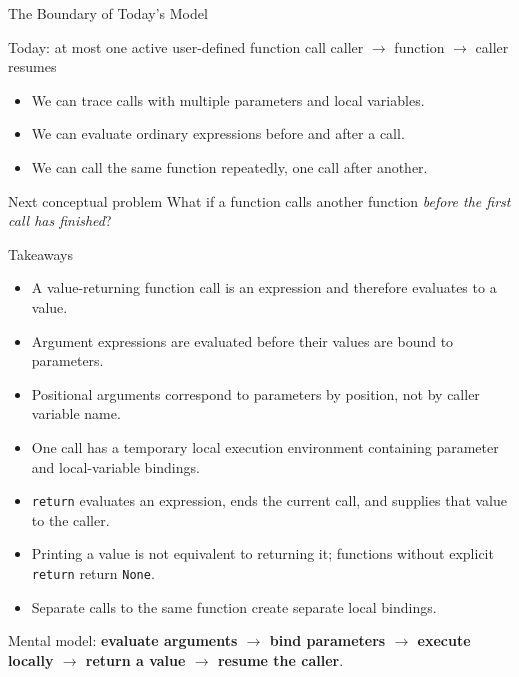 \documentclass[aspectratio=169,10pt]{beamer}
\begin{document}
\begin{frame}{The Boundary of Today's Model}
  \begin{block}{Today: at most one active user-defined function call}
    \centering
    caller
    $\longrightarrow$
    function
    $\longrightarrow$
    caller resumes
  \end{block}

  \begin{itemize}
    \item We can trace calls with multiple parameters and local variables.
    \item We can evaluate ordinary expressions before and after a call.
    \item We can call the same function repeatedly, one call after another.
  \end{itemize}

  \begin{alertblock}{Next conceptual problem}
    What if a function calls another function \emph{before the first call has finished}?
  \end{alertblock}
\end{frame}

\begin{frame}{Takeaways}
  \begin{itemize}
    \item A value-returning function call is an expression and therefore evaluates to a value.
    \item Argument expressions are evaluated before their values are bound to parameters.
    \item Positional arguments correspond to parameters by position, not by caller variable name.
    \item One call has a temporary local execution environment containing parameter and local-variable bindings.
    \item \texttt{return} evaluates an expression, ends the current call, and supplies that value to the caller.
    \item Printing a value is not equivalent to returning it; functions without explicit \texttt{return} return \texttt{None}.
    \item Separate calls to the same function create separate local bindings.
  \end{itemize}

  \begin{keyidea}
    Mental model: \textbf{evaluate arguments $\rightarrow$ bind parameters $\rightarrow$ execute locally $\rightarrow$ return a value $\rightarrow$ resume the caller}.
  \end{keyidea}
\end{frame}
\end{document}
